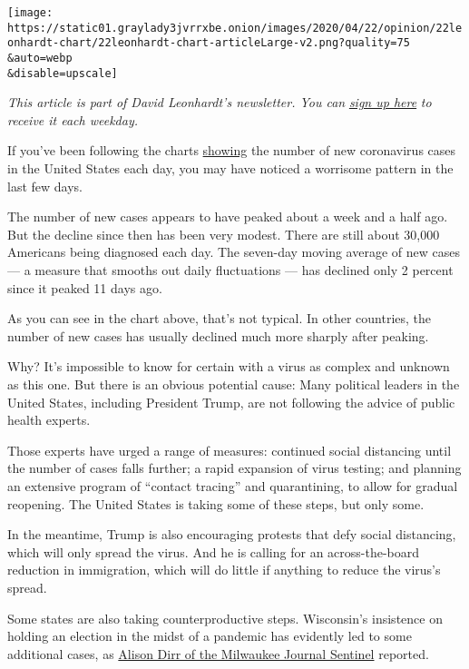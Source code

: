\texttt{[image: https://static01.graylady3jvrrxbe.onion/images/2020/04/22/opinion/22leonhardt-chart/22leonhardt-chart-articleLarge-v2.png?quality=75\\\&auto=webp\\\&disable=upscale]}

\emph{This article is part of David Leonhardt's newsletter. You can}
\href{https://www.nytimes3xbfgragh.onion/newsletters/opiniontoday?action=click\&module=Intentional\&pgtype=Article}{\emph{sign
up here}} \emph{to receive it each weekday.}

If you've been following the charts
\href{https://www.nytimes3xbfgragh.onion/interactive/2020/us/coronavirus-us-cases.html}{showing}
the number of new coronavirus cases in the United States each day, you
may have noticed a worrisome pattern in the last few days.

The number of new cases appears to have peaked about a week and a half
ago. But the decline since then has been very modest. There are still
about 30,000 Americans being diagnosed each day. The seven-day moving
average of new cases --- a measure that smooths out daily fluctuations
--- has declined only 2 percent since it peaked 11 days ago.

As you can see in the chart above, that's not typical. In other
countries, the number of new cases has usually declined much more
sharply after peaking.

Why? It's impossible to know for certain with a virus as complex and
unknown as this one. But there is an obvious potential cause: Many
political leaders in the United States, including President Trump, are
not following the advice of public health experts.

Those experts have urged a range of measures: continued social
distancing until the number of cases falls further; a rapid expansion of
virus testing; and planning an extensive program of ``contact tracing''
and quarantining, to allow for gradual reopening. The United States is
taking some of these steps, but only some.

In the meantime, Trump is also encouraging protests that defy social
distancing, which will only spread the virus. And he is calling for an
across-the-board reduction in immigration, which will do little if
anything to reduce the virus's spread.

Some states are also taking counterproductive steps. Wisconsin's
insistence on holding an election in the midst of a pandemic has
evidently led to some additional cases, as
\href{https://www.jsonline.com/story/news/local/milwaukee/2020/04/20/coronavirus-milwaukee-7-new-cases-may-tied-april-7-election/5168669002/}{Alison
Dirr of the Milwaukee Journal Sentinel} reported.

